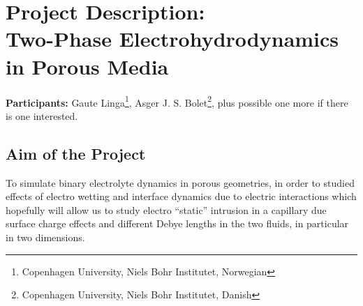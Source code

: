 \documentclass[a4paper,10pt]{article}
\begin{document}
\section*{Project Description:\\Two-Phase Electrohydrodynamics in Porous Media}
\textbf{Participants:} Gaute Linga\footnote{Copenhagen University, Niels Bohr Institutet, Norwegian}, Asger J. S. Bolet\footnote{Copenhagen University, Niels Bohr Institutet, Danish}, plus possible one more if there is one interested.

\subsection*{Aim of the Project}
To simulate binary electrolyte dynamics in porous geometries, in order to studied effects of electro wetting and interface dynamics due to electric interactions which hopefully will allow us to study electro ``static'' intrusion in a capillary due surface charge effects and different Debye lengths in the two fluids, in particular in two dimensions.
\end{document}
